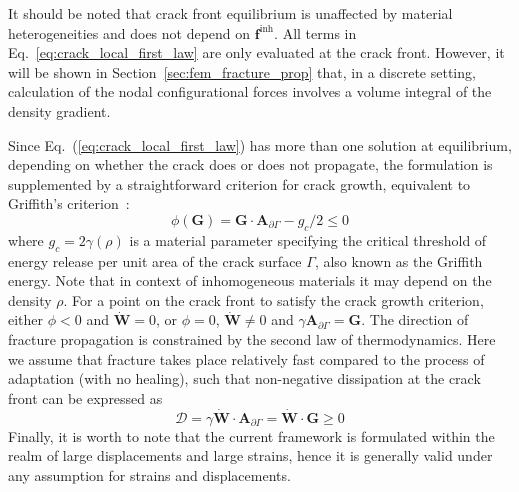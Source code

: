 \documentclass[onecolumn]{svjour3}
\begin{document}
It should be noted that crack front equilibrium is unaffected by material heterogeneities and does not depend on $\mathbf f^{\mathrm {inh}}$. All terms in Eq.~\ref{eq:crack_local_first_law} are only evaluated at the crack front. However, it will be shown in Section~\ref{sec:fem_fracture_prop} that, in a discrete setting, calculation of the nodal configurational forces involves a volume integral of the density gradient.

Since Eq.~(\ref{eq:crack_local_first_law}) has more than one solution at equilibrium, depending on whether the crack 
does or does not propagate, the formulation is supplemented by a straightforward criterion for crack growth, equivalent to Griffith's  criterion~\cite{kaczmarczyk2017energy}:
\begin{equation} \label{eq:grif1}
\phi(\mathbf{G}) = 
\mathbf{G} \cdot \mathbf{A}_{\partial\Gamma} - g_c/2 \leq 0
\end{equation} 
where $g_c=2\gamma(\rho)$ is a material parameter specifying the critical threshold of energy release
per unit area of the crack surface $\Gamma$, also known as the Griffith energy. Note that in context of inhomogeneous materials it may depend on the density $\rho$. For a point on the crack front to satisfy the crack growth criterion, 
either $\phi<0$ and $\dot{\mathbf{W}}=0$, or $\phi=0$, $\dot{\mathbf{W}}\ne 0$ and $\gamma\mathbf{A}_{\partial\Gamma}=\mathbf{G}$. 
% 
% 
The direction of fracture propagation is
constrained by the second law of thermodynamics. Here we assume that fracture takes place
relatively fast compared to the process of adaptation (with no healing), 
such that non-negative dissipation at the crack front can be expressed as
\begin{equation}
	\mathcal{D} = \gamma \dot{\mathbf{W}} \cdot \mathbf{A}_{\partial\Gamma}= \dot{\mathbf{W}} \cdot \mathbf{G}\ge0
\end{equation}
% 
Finally, it is worth to note that the current framework is formulated within 
the realm of large displacements and large strains, hence it 
is generally valid under any assumption for strains and displacements. 
\end{document}

